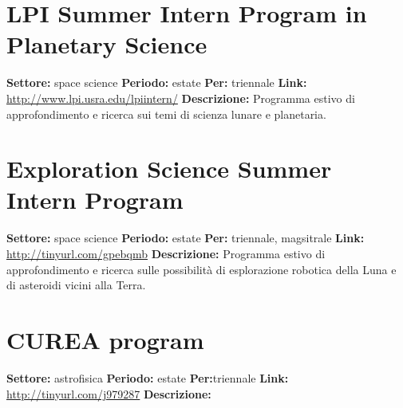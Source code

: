 \documentclass[a4paper,10pt]{article}
\begin{document}
\section{LPI Summer Intern Program in Planetary Science}
\textbf{Settore:} space science\newline
\textbf{Periodo:} estate\newline
\textbf{Per:} triennale\newline
\textbf{Link:} \url{http://www.lpi.usra.edu/lpiintern/} \newline
\textbf{Descrizione:}  Programma estivo di approfondimento e ricerca sui temi di scienza lunare e planetaria.	

\section{Exploration Science Summer Intern Program}
\textbf{Settore:} space science\newline
\textbf{Periodo:} estate \newline
\textbf{Per:} triennale, magsitrale\newline
\textbf{Link:} \url{http://tinyurl.com/gpebqmb} \newline
\textbf{Descrizione:} Programma estivo di approfondimento e ricerca sulle possibilità di esplorazione robotica della Luna e di asteroidi vicini alla Terra.	

\section{CUREA program}
\textbf{Settore:} astrofisica\newline
\textbf{Periodo:} estate \newline
\textbf{Per:}triennale\newline
\textbf{Link:} \url{http://tinyurl.com/j979287} \newline
\textbf{Descrizione:}  
\end{document}
